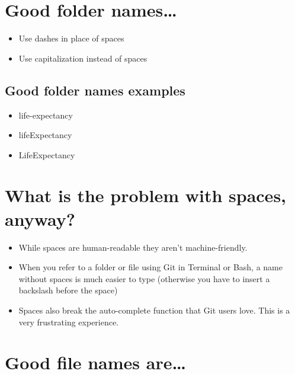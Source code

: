 \documentclass[
]{book}
\providecommand{\tightlist}{%
  \setlength{\itemsep}{0pt}\setlength{\parskip}{0pt}}
\begin{document}
\hypertarget{good-folder-names}{%
\section{Good folder names\ldots{}}\label{good-folder-names}}

\begin{itemize}
\tightlist
\item
  Use dashes in place of spaces
\item
  Use capitalization instead of spaces
\end{itemize}

\hypertarget{good-folder-names-examples}{%
\subsection{Good folder names examples}\label{good-folder-names-examples}}

\begin{itemize}
\tightlist
\item
  life-expectancy
\item
  lifeExpectancy
\item
  LifeExpectancy
\end{itemize}

\hypertarget{what-is-the-problem-with-spaces-anyway}{%
\section{What is the problem with spaces, anyway?}\label{what-is-the-problem-with-spaces-anyway}}

\begin{itemize}
\tightlist
\item
  While spaces are human-readable they aren't machine-friendly.
\item
  When you refer to a folder or file using Git in Terminal or Bash, a name
  without spaces is much easier to type (otherwise you have to insert a
  backslash before the space)
\item
  Spaces also break the auto-complete function that Git users love. This is a
  very frustrating experience.
\end{itemize}

\hypertarget{good-file-names-are}{%
\section{Good file names are\ldots{}}\label{good-file-names-are}}
\end{document}
